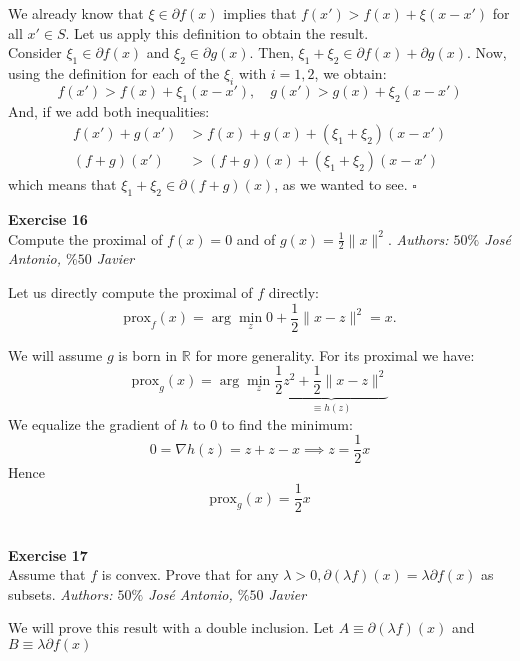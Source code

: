 \documentclass[11pt,table]{article}
\newcommand{\qed}{\hfill $\square$}
\newenvironment{problem}[2][Exercise]
{ \begin{mdframed}[backgroundcolor=gray!20] \textbf{#1 #2} \\}
	{\hspace{0.0cm}\newline\newline \emph{Authors: \(50\%\) José Antonio, \(\%50\) Javier}  \end{mdframed}}
\newcommand\R{\mathbb R}
\begin{document}
We already know that \(\xi \in \partial f(x)\) implies that \(f(x') > f(x) + \xi(x-x')\) for all \(x' \in S\). Let us apply this definition to obtain the result.\\
Consider \(\xi_1 \in \partial f(x)\) and \(\xi_2 \in \partial g(x)\). Then, \(\xi_1 + \xi_2 \in \partial f(x) + \partial g(x)\). Now, using the definition for each of the \(\xi_i\) with \(i = 1,2\), we obtain:
\[
	f(x') > f(x) + \xi_1 (x-x'), \quad g(x') > g(x) + \xi_2(x-x')
\]
And, if we add both inequalities:
\begin{align*}
	f(x') + g(x')        & > f(x) + g(x) + (\xi_1 + \xi_2)(x-x')        \\
	\left(f+g\right)(x') & >\left(f+g\right)(x) + (\xi_1 + \xi_2)(x-x')
\end{align*}
which means that \(\xi_1 + \xi_2 \in \partial \left(f+g\right)(x) \), as we wanted to see. \qed \\

\begin{problem}{16}
Compute the proximal of \( f(x) = 0 \) and of \( g(x) = \frac{1}{2}\|x\|^2 \).
\end{problem}

Let us directly compute the proximal of $f$ directly:
\[
	\text{prox}_f(x) = \arg \min_z 0 + \frac{1}{2} \parallel x - z \parallel^2 = x.
\]

We will assume $g$ is born in $\R$ for more generality. For its proximal we have:
\[
	\text{prox}_g(x) = \arg \min_z \underbrace{\frac{1}{2}z^2 + \frac{1}{2} \parallel x - z \parallel^2}_{\equiv h(z)}
\]
We equalize the gradient of $h$ to $0$ to find the minimum:
\[
	0 = \nabla h(z) = z + z - x \implies z = \frac{1}{2}x
\]
Hence
\[
	\text{prox}_g(x) =  \frac{1}{2} x
\] \\

\begin{problem}{17}
Assume that \( f \)  is convex. Prove that for any \( \lambda > 0, \partial(\lambda f)(x) = \lambda \partial f(x) \) as subsets.
\end{problem}

We will prove this result with a double inclusion. Let $A \equiv \partial(\lambda f)(x)$ and $B \equiv \lambda \partial f(x)$
\end{document}

